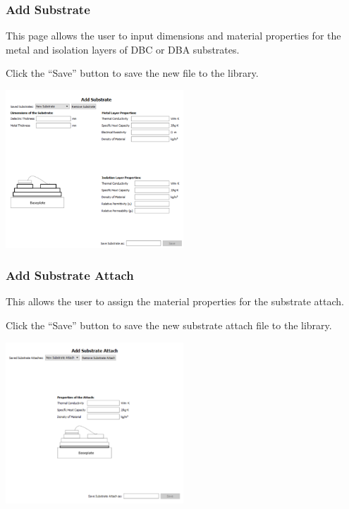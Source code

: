 \documentclass[11pt]{article}
\begin{document}
\pagebreak

\subsubsection{Add Substrate}
\label{sec-3-1-5}

This page allows the user to input dimensions and material properties for the metal and isolation layers of DBC or DBA substrates.

Click the “Save” button to save the new file to the library.

\begin{center}
\includegraphics[width=0.5\textwidth]{./figs/37_TL-Sub.png}
\end{center}


\subsubsection{Add Substrate Attach}
\label{sec-3-1-6}

This allows the user to assign the material properties for the substrate attach.

Click the “Save” button to save the new substrate attach file to the library.

\begin{center}
\includegraphics[width=0.5\textwidth]{./figs/38_TL-SubAttach.png}
\end{center}
\end{document}
